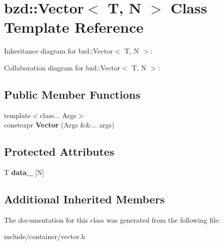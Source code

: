 \hypertarget{classbzd_1_1Vector}{}\section{bzd\+:\+:Vector$<$ T, N $>$ Class Template Reference}
\label{classbzd_1_1Vector}


Inheritance diagram for bzd\+:\+:Vector$<$ T, N $>$\+:


Collaboration diagram for bzd\+:\+:Vector$<$ T, N $>$\+:
\subsection*{Public Member Functions}
\begin{DoxyCompactItemize}
\item 
\mbox{\label{classbzd_1_1Vector_af05b556b4e1bcb9fb6c0f51d915c6639}} 
{\footnotesize template$<$class... Args$>$ }\\constexpr {\bfseries Vector} (Args \&\&... args)
\end{DoxyCompactItemize}
\subsection*{Protected Attributes}
\begin{DoxyCompactItemize}
\item 
\mbox{\label{classbzd_1_1Vector_af94fee77ac84d9b8e849166c2fb03b95}} 
T {\bfseries data\+\_\+} \mbox{[}N\mbox{]}
\end{DoxyCompactItemize}
\subsection*{Additional Inherited Members}


The documentation for this class was generated from the following file\+:\begin{DoxyCompactItemize}
\item 
include/container/vector.\+h\end{DoxyCompactItemize}
